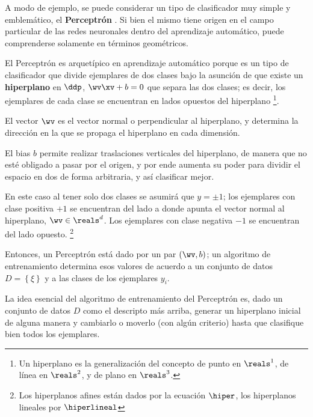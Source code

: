 
A modo de ejemplo, se puede considerar un tipo de clasificador muy simple y emblemático, el \textbf{Perceptrón} \cite{rosenblatt1958}. Si bien el mismo tiene origen en el campo particular de las redes neuronales dentro del aprendizaje automático, puede comprenderse solamente en términos geométricos. 

El Perceptrón es arquetípico en aprendizaje automático porque es un tipo de clasificador que divide ejemplares de dos clases bajo la asunción de que existe un \textbf{hiperplano} en $\ddp$, $\wv \xv +b=0$ que separa las dos clases; es decir, los ejemplares de cada clase se encuentran en lados opuestos del hiperplano \footnote{Un hiperplano es la generalización del concepto de punto en $\reals^1$, de línea en $\reals^2$, y de plano en $\reals^3$.}.

El vector $\wv$ es el vector normal o perpendicular al hiperplano, y determina la dirección en la que se propaga el hiperplano en cada dimensión.

El bias $b$ permite realizar traslaciones verticales del hiperplano, de manera que no esté obligado a pasar por el origen, y por ende aumenta su poder para dividir el espacio en dos de forma arbitraria, y así clasificar mejor.

En este caso al tener solo dos clases se asumirá que $y=\pm 1$; los ejemplares con clase positiva $+1$ se encuentran del lado a donde apunta el vector normal al hiperplano, $\wv \in \reals^d$. Los ejemplares con clase negativa $-1$ se encuentran del lado opuesto. \footnote{Los hiperplanos afines están dados por la ecuación $\hiper$, los hiperplanos lineales por $\hiperlineal$}



Entonces, un Perceptrón está dado por un par $(\wv,b)$; un algoritmo de entrenamiento determina esos valores de acuerdo a un conjunto de datos $D=\left\lbrace \xi \right\rbrace$ y a las clases de los ejemplares $y_i$. 

La idea esencial del algoritmo de entrenamiento del Perceptrón es, dado un conjunto de datos $D$ como el descripto más arriba, generar un hiperplano inicial de alguna manera y cambiarlo o moverlo (con algún criterio) hasta que clasifique bien todos los ejemplares.



